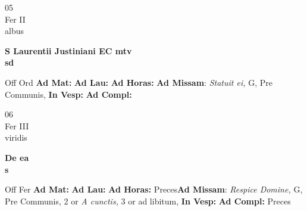 \documentclass[10pt, openany]{book}
\begin{document}
        \begin{center}
            \begin{minipage}{3.5in}
                \vspace{2em}
                \begin{minipage}{0.5in}
                    {\Huge 05} \\
                    {\normalsize Fer II} \\
                    {\normalsize albus}
                \end{minipage}
                \begin{minipage}{3.0in}
                    \textbf{ \large S Laurentii Justiniani EC mtv \\
                    \textnormal{\normalsize sd}} \\ 
                \end{minipage}
                \begin{justify}Off Ord
                    \textbf{Ad Mat: }
                    \textbf{Ad Lau: }
                    \textbf{Ad Horas: }\textbf{Ad Missam}: \textit{Statuit ei,} G, Pre Communis,  
                    \textbf{In Vesp: }
                    \textbf{Ad Compl: }
                \end{justify}
            \end{minipage}
        \end{center}
    
        \begin{center}
            \begin{minipage}{3.5in}
                \vspace{2em}
                \begin{minipage}{0.5in}
                    {\Huge 06} \\
                    {\normalsize Fer III} \\
                    {\normalsize viridis}
                \end{minipage}
                \begin{minipage}{3.0in}
                    \textbf{ \large De ea \\
                    \textnormal{\normalsize s}} \\ 
                \end{minipage}
                \begin{justify}Off Fer
                    \textbf{Ad Mat: }
                    \textbf{Ad Lau: }
                    \textbf{Ad Horas: }Preces\textbf{Ad Missam}: \textit{Respice Domine,} G, Pre Communis, 2 or \textit{A cunctis,} 3 or ad libitum,  
                    \textbf{In Vesp: }
                    \textbf{Ad Compl: }Preces
                \end{justify}
            \end{minipage}
        \end{center}
    
\end{document}
